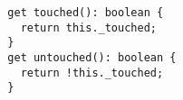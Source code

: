 \begin{verbatim}
  get touched(): boolean {
    return this._touched;
  }
  get untouched(): boolean {
    return !this._touched;
  }
\end{verbatim}

